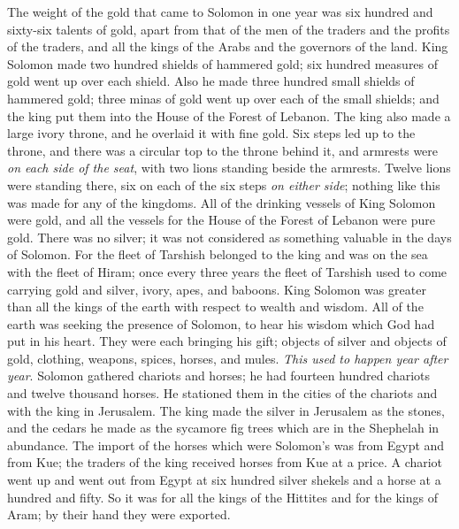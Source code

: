 \begin{biblechapter}
\verse The weight of the gold that came to Solomon in one year was six hundred and sixty-six talents of gold,
\verse apart from that of the men of the traders and the profits of the traders, and all the kings of the Arabs and the governors of the land.
\verse King Solomon made two hundred shields of hammered gold; six hundred measures of gold went up over each shield.
\verse Also he made three hundred small shields of hammered gold; three minas of gold went up over each of the small shields; and the king put them into the House of the Forest of Lebanon.
\verse The king also made a large ivory throne, and he overlaid it with fine gold.
\verse Six steps led up to the throne, and there was a circular top to the throne behind it, and armrests were \textit{on each side of the seat}, with two lions standing beside the armrests.
\verse Twelve lions were standing there, six on each of the six steps \textit{on either side}; nothing like this was made for any of the kingdoms.
\verse All of the drinking vessels of King Solomon were gold, and all the vessels for the House of the Forest of Lebanon were pure gold. There was no silver; it was not considered as something valuable in the days of Solomon.
\verse For the fleet of Tarshish belonged to the king and was on the sea with the fleet of Hiram; once every three years the fleet of Tarshish used to come carrying gold and silver, ivory, apes, and baboons.
\verse King Solomon was greater than all the kings of the earth with respect to wealth and wisdom.
\verse All of the earth was seeking the presence of Solomon, to hear his wisdom which God had put in his heart.
\verse They were each bringing his gift; objects of silver and objects of gold, clothing, weapons, spices, horses, and mules. \textit{This used to happen year after year}.
\verse Solomon gathered chariots and horses; he had fourteen hundred chariots and twelve thousand horses. He stationed them in the cities of the chariots and with the king in Jerusalem.
\verse The king made the silver in Jerusalem as the stones, and the cedars he made as the sycamore fig trees which are in the Shephelah in abundance.
\verse The import of the horses which were Solomon’s was from Egypt and from Kue; the traders of the king received horses from Kue at a price.
\verse A chariot went up and went out from Egypt at six hundred silver shekels and a horse at a hundred and fifty. So it was for all the kings of the Hittites and for the kings of Aram; by their hand they were exported.
\end{biblechapter}

